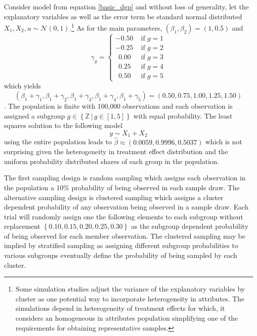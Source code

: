 \documentclass{jbsc}
\begin{document}
Consider model from equation \ref{basic_dgp} and without loss of generality, let the explanatory variables as well as the error term be standard normal distributed $X_{1}, X_{2}, u \sim \mathcal{N}\left(0,1\right)$.\footnote{Some simulation studies adjust the variance of the explanatory variables by cluster as one potential way to incorporate heterogeneity in attributes. The simulations depend in heterogeneity of treatment effects for which, it considers an homogeneous in attributes population simplifying one of the requirements for obtaining representative samples.} As for the main parameters, $\left(\beta_{1}, \beta_{2}\right) = \left(1, 0.5\right)$ and
\begin{equation}
\gamma_{g} =
\begin{cases}
- 0.50 & \text{ if } g = 1\\
- 0.25 & \text{ if } g = 2\\
\ \ 0.00 & \text{ if } g = 3\\
\ \ 0.25 & \text{ if } g = 4\\
\ \ 0.50 & \text{ if } g = 5
\end{cases}
\end{equation}
which yields
\begin{equation*}
    \left(\beta_{1} + \gamma_{1}, \beta_{1} + \gamma_{2}, \beta_{1} + \gamma_{3}, \beta_{1} + \gamma_{4}, \beta_{1} + \gamma_{5}\right) = \left(0.50, 0.75, 1.00, 1.25, 1.50\right)
\end{equation*}.
The population is finite with 100,000 observations and each observation is assigned a subgroup $g \in \left\{\mathbb{Z}\,|\,g \in [1, 5]\right\}$ with equal probability. The least squares solution to the following model
\begin{equation}
\label{naiveformula}
y \sim X_{1} + X_{2}
\end{equation}
using the entire population leads to $\hat{\beta} \approx \left(0.0059, 0.9996, 0.5037\right)$ which is not surprising given the heterogeneity in treatment effect distribution and the uniform probability distributed shares of each group in the population.

The first sampling design is random sampling which assigns each observation in the population a 10\% probability of being observed in each sample draw. The alternative sampling design is clustered sampling which assigns a cluster dependent probability of any observation being observed in a sample draw. Each trial will randomly assign one the following elements to each subgroup without replacement $\left\{0.10, 0.15, 0.20, 0.25, 0.30\right\}$ as the subgroup dependent probability of being observed for each member observation. The clustered sampling may be implied by stratified sampling as assigning different subgroup probabilities to various subgroups eventually define the probability of being sampled by each cluster.
\end{document}
